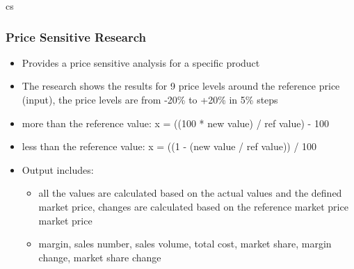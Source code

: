 \gls{cs} %
\subsubsection{Price Sensitive Research}
    \begin{itemize}
        \item Provides a price sensitive analysis for a specific product
        \item The research shows the results for 9 price levels around the reference price (input), the price levels are from -20\% to +20\% in 5\% steps
        \item more than the reference value: x = ((100 * new value) / ref value) - 100
        \item less than the reference value: x = ((1 - (new value / ref value)) / 100
        \item Output includes: 
        \begin{itemize}
            \item all the values are calculated based on the actual values and the defined market price, changes are calculated based on the reference market price 
            market price
            \item margin, sales number, sales volume, total cost, market share, margin change, market share change
        \end{itemize}
        \end{itemize}
       
